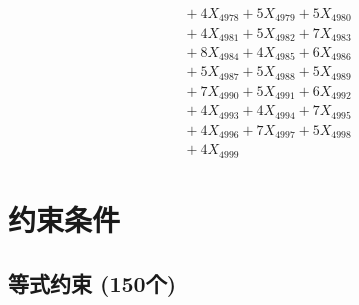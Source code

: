 \documentclass[a4paper,10pt]{article}
\begin{document}
{\begin{align}
&\;  + 4 X_{4978} + 5 X_{4979} + 5 X_{4980} \\[0.3ex]
&\;  + 4 X_{4981} + 5 X_{4982} + 7 X_{4983} \\[0.3ex]
&\;  + 8 X_{4984} + 4 X_{4985} + 6 X_{4986} \\[0.3ex]
&\;  + 5 X_{4987} + 5 X_{4988} + 5 X_{4989} \\[0.5ex]\allowbreak
&\;  + 7 X_{4990} + 5 X_{4991} + 6 X_{4992} \\[0.3ex]
&\;  + 4 X_{4993} + 4 X_{4994} + 7 X_{4995} \\[0.3ex]
&\;  + 4 X_{4996} + 7 X_{4997} + 5 X_{4998} \\[0.3ex]
&\;  + 4 X_{4999}\nonumber
\end{align}
}

\section{约束条件}

\subsection{等式约束 (150个)}
\end{document}

